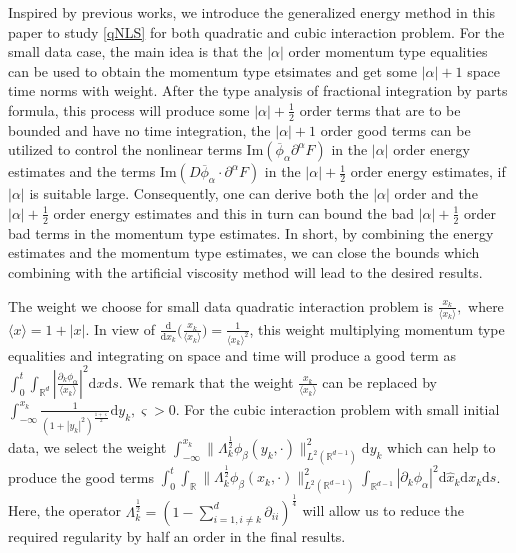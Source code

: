 \documentclass[10pt,twoside,a4paper]{article}
\numberwithin{equation}{section}\allowdisplaybreaks
\begin{document}
Inspired by previous works, we introduce the  generalized energy method in this paper to study \eqref{qNLS} for both  quadratic  and cubic interaction problem. For the small data case, the main idea is that   the $ |\alpha| $ order  momentum type equalities  can be used to obtain the momentum type etsimates and get some $ |\alpha|+1 $ space time norms with  weight. After  the type analysis of fractional integration by parts formula, this process will produce  some  $ |\alpha|+\frac12 $ order  terms that are to be bounded and have no time integration, the   $ |\alpha|+1 $ order good terms  can be utilized to control  the nonlinear terms $ \mathrm{Im} (\overline{\phi}_{\alpha} \partial^{\alpha} F) $  in the  $ |\alpha| $ order  energy estimates and the terms $ \mathrm{Im} (D \overline{\phi}_{\alpha}\cdot \partial^{\alpha} F) $ in the $ |\alpha|+\frac 12 $ order  energy estimates, if $ |\alpha| $ is suitable large.  Consequently, one can derive both the   $ |\alpha| $ order   and   the $ |\alpha|+\frac 12 $ order  energy estimates and this in turn  can bound the bad  $ |\alpha|+\frac12 $ order bad  terms in  the momentum type estimates. In short,  by combining the energy estimates and the momentum type estimates, we can close the bounds which combining with the artificial viscosity method will lead to the desired results.  
 
  The weight we choose  for small data quadratic interaction problem is $ \frac {x_k}{\langle x_k \rangle},$ where $ \langle x\rangle =1+\left|x\right|$. In view of  $ \frac{\mathrm{d} }{\mathrm{d} x_k} \big(\frac {x_k}{\langle x_k \rangle}\big) =\frac {1}{\langle x_k \rangle^2}$,  this weight multiplying  momentum type equalities and integrating on space and time will produce a good term as $ \int_0^t     \int_{\mathbb{R}^{d}}  |\frac{\partial_k \phi_{\alpha }  } {\langle x_k\rangle} |^2  \mathrm{d} x \mathrm{d} s $.   We remark that the weight $  \frac {x_k}{\langle x_k \rangle} $  can be replaced by
$ \int_{-\infty}^{x_k}\frac{1}{(1+|y_k|^2)^{\frac {1+\varsigma}{2}}} \mathrm{d} y_k, \varsigma>0. $
For the cubic interaction problem with small initial data, we select  the weight $ \int_{-\infty}^{x_k} \|\Lambda_k^{\frac 12}\phi_{\beta}(y_k,\cdot)\|^2_{L^2(\mathbb{R}^{d-1})} \mathrm{d} y_k$ which  can help to produce the good terms $ \int_0^t\int_{\mathbb{R}}  \|\Lambda_k^{\frac 12}\phi_{\beta}(x_k,\cdot)\|^2_{L^2(\mathbb{R}^{d-1})}   \int_{\mathbb{R}^{d-1}} \left|\partial_k \phi_{\alpha } \right|^2 \mathrm{d} \hat{x}_k  \mathrm{d} x_k \mathrm{d} s$. Here,
  the operator $\Lambda_k^{\frac{1}{2}} = \left(1 - \sum_{i=1, i \neq k}^d \partial_{ii} \right)^{\frac{1}{4}}$ will allow us to reduce the required regularity by half an order in the final results.
\end{document}
